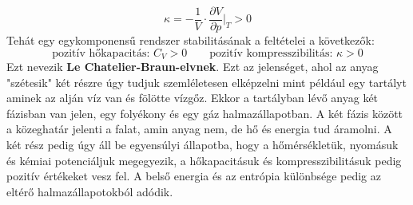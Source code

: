 \documentclass[../main.tex]{subfiles}
\begin{document}
\begin{equation}
    \kappa = - \frac{1}{V} \cdot \frac{\partial V}{\partial p}\bigg|_{T} > 0
\end{equation}
Tehát egy egykomponensű rendszer stabilitásának a feltételei a következők:
\begin{equation}
    \boxed{\text{pozitív hőkapacitás: } C_{V} > 0 \qquad \text{pozitív kompresszibilitás: } \kappa > 0}
\end{equation}
Ezt nevezik \textbf{Le Chatelier-Braun-elvnek}. 
\newline
\newline
Ezt az jelenséget, ahol az anyag "szétesik" két részre úgy tudjuk szemléletesen elképzelni mint például egy tartályt aminek az alján víz van és fölötte vízgőz.
Ekkor a tartályban lévő anyag két fázisban van jelen, egy folyékony és egy gáz halmazállapotban. A két fázis között a közeghatár jelenti a falat, amin anyag nem,
de hő és energia tud áramolni. A két rész pedig úgy áll be egyensúlyi állapotba, hogy a hőmérsékletük, nyomásuk és kémiai potenciáljuk megegyezik, 
a hőkapacitásuk és kompresszibilitásuk pedig pozitív értékeket vesz fel. A belső energia és az entrópia különbsége pedig az eltérő halmazállapotokból adódik.
\end{document}
